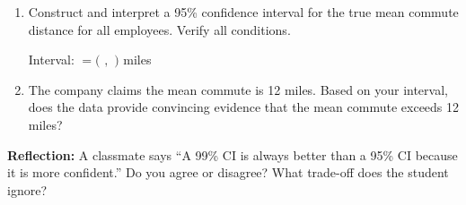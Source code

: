 \documentclass[10pt]{article}
\begin{document}
\begin{enumerate}
        \begin{enumerate}[label=\alph*.]
          \boxguard
          \item Construct and interpret a 95\% confidence interval for the true mean
                commute distance for all employees. Verify all conditions. 

                Interval: $= ($ \makebox[2cm]{\smash{\gradedblank[id=hw3a1, type=short, points=1, answer=10.92, check=numeric, tolerance=0.05]{1.8cm}{0.19in}}}$,$ \makebox[2cm]{\smash{\gradedblank[id=hw3a2, type=short, points=1, answer=18.28, check=numeric, tolerance=0.05]{1.8cm}{0.19in}}}$)$ miles

          \boxguard

          \item The company claims the mean commute is 12 miles. Based on your interval,
                does the data provide convincing evidence that the mean commute exceeds
                12 miles? 
        \end{enumerate}

\end{enumerate}

\begin{reflectionbox}
\textbf{Reflection:} A classmate says ``A 99\% CI is always better than a 95\% CI
because it is more confident.'' Do you agree or disagree? What trade-off does the
student ignore?

\end{reflectionbox}
\end{document}

